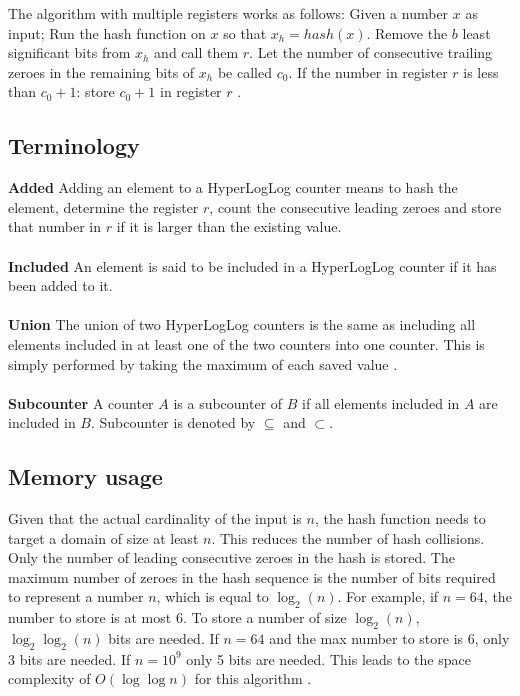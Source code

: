 The algorithm with multiple registers works as follows: Given a number $x$ as input; Run the hash function on $x$ so that $x_h = hash(x)$. Remove the $b$ least significant bits from $x_h$ and call them $r$. Let the number of consecutive trailing zeroes in the remaining bits of $x_h$ be called $c_0$. If the number in register $r$ is less than $c_0 + 1$: store $c_0 + 1$ in register $r$ \cite{hyperloglog}.


\subsection{Terminology}
\textbf{Added }
Adding an element to a HyperLogLog counter means to hash the element, determine the register $r$, count the consecutive leading zeroes and store that number in $r$ if it is larger than the existing value.\\\\
\textbf{Included }
An element is said to be included in a HyperLogLog counter if it has been added to it.\\\\
\textbf{Union }
The union of two HyperLogLog counters is the same as including all elements included in at least one of the two counters into one counter. This is simply performed by taking the maximum of each saved value \cite{hyperanf}.\\\\
\textbf{Subcounter }
A counter $A$ is a subcounter of $B$ if all elements included in $A$ are included in $B$. Subcounter is denoted by $\subseteq$ and $\subset$.


\subsection{Memory usage}

Given that the actual cardinality of the input is $n$, the hash function needs to target a domain of size at least $n$. This reduces the number of hash collisions. Only the number of leading consecutive zeroes in the hash is stored. The maximum number of zeroes in the hash sequence is the number of bits required to represent a number $n$, which is equal to $\log_2(n)$. For example, if $n=64$, the number to store is at most 6. To store a number of size $\log_2(n)$, $\log_2\log_2(n)$ bits are needed. If $n=64$ and the max number to store is 6, only 3 bits are needed. If $n=10^9$ only 5 bits are needed. This leads to the space complexity of $O(\log\log n)$ for this algorithm \cite{hyperloglog}. 


